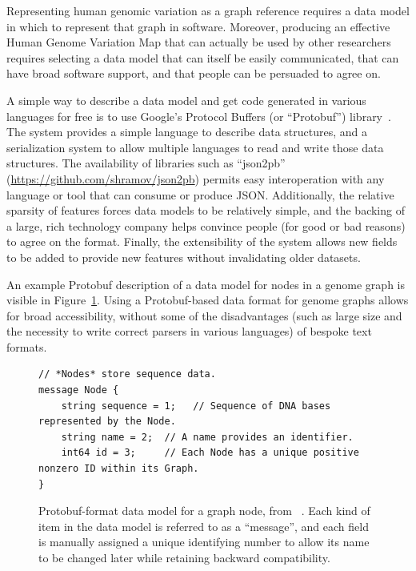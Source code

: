 Representing human genomic variation as a graph reference requires a data model in which to represent that graph in software. Moreover, producing an effective Human Genome Variation Map that can actually be used by other researchers requires selecting a data model that can itself be easily communicated, that can have broad software support, and that people can be persuaded to agree on.

A simple way to describe a data model and get code generated in various languages for free is to use Google's Protocol Buffers (or ``Protobuf'') library~\cite{varda2008protocol}. The system provides a simple language to describe data structures, and a serialization system to allow multiple languages to read and write those data structures. The availability of libraries such as ``json2pb'' (\url{https://github.com/shramov/json2pb}) permits easy interoperation with any language or tool that can consume or produce JSON. Additionally, the relative sparsity of features forces data models to be relatively simple, and the backing of a large, rich technology company helps convince people (for good or bad reasons) to agree on the format. Finally, the extensibility of the system allows new fields to be added to provide new features without invalidating older datasets.

An example Protobuf description of a data model for nodes in a genome graph is visible in Figure~\ref{fig:protobuf}. Using a Protobuf-based data format for genome graphs allows for broad accessibility, without some of the disadvantages (such as large size and the necessity to write correct parsers in various languages) of bespoke text formats. 

\begin{figure}[ht]
\begin{lstlisting}
// *Nodes* store sequence data.
message Node {
    string sequence = 1;   // Sequence of DNA bases represented by the Node.
    string name = 2;  // A name provides an identifier.
    int64 id = 3;     // Each Node has a unique positive nonzero ID within its Graph.
}
\end{lstlisting}
\caption[Graph node data model]{Protobuf-format data model for a graph node, from \vg ~\cite{garrison2016vg}. Each kind of item in the data model is referred to as a ``message'', and each field is manually assigned a unique identifying number to allow its name to be changed later while retaining backward compatibility.}
\label{fig:protobuf}
\end{figure}

